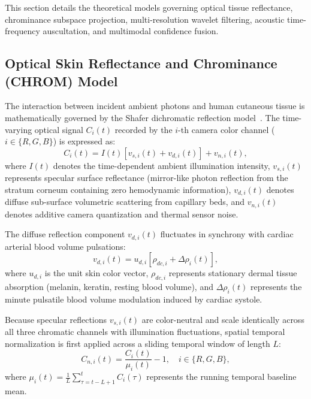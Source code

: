 \documentclass[journal]{IEEEtran}
\begin{document}
This section details the theoretical models governing optical tissue reflectance, chrominance subspace projection, multi-resolution wavelet filtering, acoustic time-frequency auscultation, and multimodal confidence fusion.

\subsection{Optical Skin Reflectance and Chrominance (CHROM) Model}

The interaction between incident ambient photons and human cutaneous tissue is mathematically governed by the Shafer dichromatic reflection model~\cite{ref15}. The time-varying optical signal $C_i(t)$ recorded by the $i$-th camera color channel ($i \in \{R, G, B\}$) is expressed as:
\begin{equation}
    C_i(t) = I(t) \left[ v_{s,i}(t) + v_{d,i}(t) \right] + v_{n,i}(t),
    \label{eq:shafer}
\end{equation}
where $I(t)$ denotes the time-dependent ambient illumination intensity, $v_{s,i}(t)$ represents specular surface reflectance (mirror-like photon reflection from the stratum corneum containing zero hemodynamic information), $v_{d,i}(t)$ denotes diffuse sub-surface volumetric scattering from capillary beds, and $v_{n,i}(t)$ denotes additive camera quantization and thermal sensor noise.

The diffuse reflection component $v_{d,i}(t)$ fluctuates in synchrony with cardiac arterial blood volume pulsations:
\begin{equation}
    v_{d,i}(t) = u_{d,i} \left[ \rho_{dc,i} + \Delta \rho_{i}(t) \right],
    \label{eq:diffuse}
\end{equation}
where $u_{d,i}$ is the unit skin color vector, $\rho_{dc,i}$ represents stationary dermal tissue absorption (melanin, keratin, resting blood volume), and $\Delta \rho_i(t)$ represents the minute pulsatile blood volume modulation induced by cardiac systole.

Because specular reflections $v_{s,i}(t)$ are color-neutral and scale identically across all three chromatic channels with illumination fluctuations, spatial temporal normalization is first applied across a sliding temporal window of length $L$:
\begin{equation}
    C_{n,i}(t) = \frac{C_i(t)}{\mu_i(t)} - 1, \quad i \in \{R, G, B\},
    \label{eq:norm_rgb}
\end{equation}
where $\mu_i(t) = \frac{1}{L} \sum_{\tau=t-L+1}^t C_i(\tau)$ represents the running temporal baseline mean.
\end{document}
